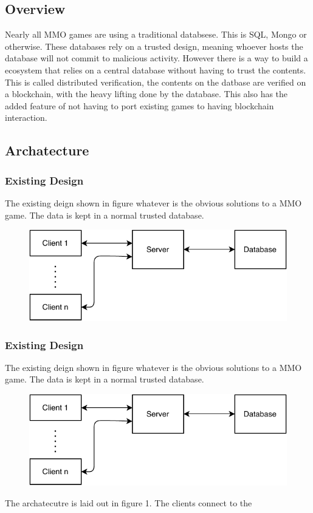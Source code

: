 \documentclass[runningheads,a4paper]{llncs}
\begin{document}
\subsection{Overview}
Nearly all MMO games are using a traditional databsese. This is SQL, Mongo or otherwise.
These databases rely on a trusted design, meaning whoever hosts the database will not 
commit to malicious activity. However there is a way to build a ecosystem that relies
on a central database without having to trust the contents.
\\

This is called distributed verification, the contents on the datbase are verified on
a blockchain, with the heavy lifting done by the database. This also has the added 
feature of not having to port existing games to having blockchain interaction.

\subsection{Archatecture}

\subsubsection{Existing Design}
The existing deign shown in figure whatever is the obvious solutions to a MMO game.
The data is kept in a normal trusted database.

\begin{figure}[H]
\includegraphics[scale=1]{img/traditional.pdf}
\end{figure}

\subsubsection{Existing Design}
The existing deign shown in figure whatever is the obvious solutions to a MMO game.
The data is kept in a normal trusted database.

\begin{figure}[H]
\includegraphics[scale=1]{img/traditional.pdf}
\end{figure}




The archatecutre is laid out in figure 1. The clients connect to the
\end{document}
